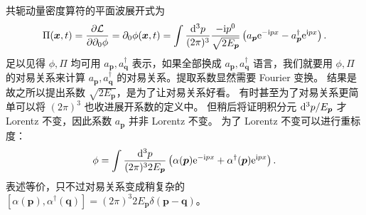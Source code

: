 共轭动量密度算符的平面波展开式为
\begin{equation}
  \Pi(\bm{x},t)=\pdv{\mathcal{L}}{\partial_0\phi}=\partial_0\phi(\bm{x},t)
  = \int\frac{\dd^3p}{(2\pi)^3}\frac{-\mathrm{i} p^0}{\sqrt{2E_{\bm{p}}}}
    \left(a_{\bm{p}}\mathrm{e}^{-\mathrm{i} p x}
    -a^\dagger_{\bm{p}}\mathrm{e}^{\mathrm{i} p x}\right).
\end{equation}
足以见得 $\phi,\Pi$ 均可用 $a_{\bm p},a_{\bm q}^\dagger$ 表示，如果全部换成 $a_{\bm p},a_{\bm q}^\dagger$ 语言，我们就要用 $\phi,\Pi$ 的对易关系来计算 $a_{\bm p},a_{\bm q}^\dagger$ 的对易关系。提取系数显然需要 Fourier 变换。
结果是
故之所以提出系数 $\sqrt{2E_{\bm p}}$，是为了让对易关系好看。
有时甚至为了对易关系更简单可以将 $(2\pi)^3$ 也收进展开系数的定义中。
但稍后将证明积分元 ${\dd[3]p}/{E_{\bm p}}$ 才 Lorentz 不变，因此系数 $a_{\bm{p}}$ 并非 Lorentz 不变。
为了 Lorentz 不变可以进行重标度：
\[\phi=\int\frac{\dd[3]p}{(2\pi)^3 2E_{\bm p}}\left(\alpha(\bm p)\mathrm{e}^{-\mathrm{i} px}+\alpha^\dagger(\bm p)\mathrm{e}^{\mathrm{i} px}\right).\]
表述等价，只不过对易关系变成稍复杂的 $[\alpha(\bm p),\alpha^\dagger(\bm q)]=(2\pi)^3 2E_{\bm p} \delta(\bm p-\bm q)$。


